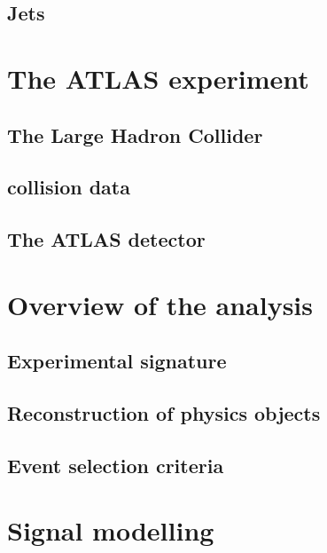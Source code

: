 \documentclass[hyper,linkcolor=blue]{mythesis}
\begin{document}
\begin{mainmatter}
    \section{Jets}
      \label{sec:jets}
      

  \chapter{The ATLAS experiment}
    \label{chap:experiment}
    
    \section{The Large Hadron Collider}
      \label{sec:lhc}
      
    \section{\pp collision data}
      \label{sec:dataset}
      
    \section{The ATLAS detector}
      \label{sec:atlas}
      
  
  \chapter{Overview of the \HWW analysis}
    \label{chap:selection}
    
    \section{Experimental signature}
      \label{sec:signature}
      
    \section{Reconstruction of physics objects}
      \label{sec:objects}
      
    \section{Event selection criteria}
      \label{sec:selection}
      

  \chapter{Signal modelling}
    \label{chap:signal}
    

\end{mainmatter}
\end{document}
